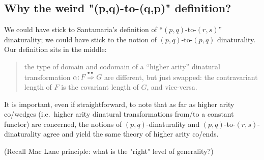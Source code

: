 \documentclass[11pt]{amsart}
\def\din{\overset{\bullet\bullet}\Longrightarrow}
\begin{document}
\subsection{Why the weird "(p,q)-to-(q,p)" definition?}
We could have stick to Santamaria's definition of ``$(p,q)$-to-$(r,s)$'' dinaturality; we could have stick to the notion of $(p,q)$-to-$(p,q)$ dinaturality. Our definition sits in the middle:
\begin{quote}
	the type of domain and codomain of a ``higher arity'' dinatural transformation $\alpha : F \din G$ are different, but just swapped: the contravariant length of $F$ is the covariant length of $G$, and vice-versa.
\end{quote}
It is important, even if straightforward, to note that as far as higher arity co/wedges (i.e.\ higher arity dinatural transformations from/to a constant functor) are concerned, the notions of $(p,q)$-dinaturality and $(p,q)$-to-$(r,s)$-dinaturality agree and yield the same theory of higher arity co/ends.

(Recall Mac Lane principle: what is the "right" level of generality?)
\end{document}
